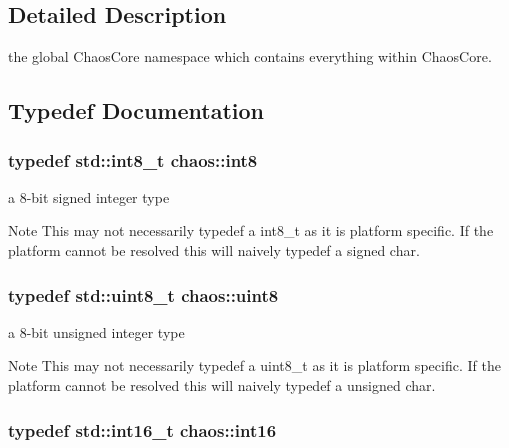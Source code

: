 \subsection{Detailed Description}
the global Chaos\-Core namespace which contains everything within Chaos\-Core. 

\subsection{Typedef Documentation}
\hypertarget{namespacechaos_a557c5c30e5a935845432e60c617bd688}{
\subsubsection[{int8}]{\setlength{\rightskip}{0pt plus 5cm}typedef std\-::int8\-\_\-t {\bf chaos\-::int8}}}\label{namespacechaos_a557c5c30e5a935845432e60c617bd688}


a 8-\/bit signed integer type 

\begin{DoxyNote}{Note}
This may not necessarily {\ttfamily typedef} a {\ttfamily int8\-\_\-t} as it is platform specific. If the platform cannot be resolved this will naively {\ttfamily typedef} a {\ttfamily signed char}. 
\end{DoxyNote}
\hypertarget{namespacechaos_acbc0796d6929e3182cfd4f5c0176ab51}{
\subsubsection[{uint8}]{\setlength{\rightskip}{0pt plus 5cm}typedef std\-::uint8\-\_\-t {\bf chaos\-::uint8}}}\label{namespacechaos_acbc0796d6929e3182cfd4f5c0176ab51}


a 8-\/bit unsigned integer type 

\begin{DoxyNote}{Note}
This may not necessarily {\ttfamily typedef} a {\ttfamily uint8\-\_\-t} as it is platform specific. If the platform cannot be resolved this will naively {\ttfamily typedef} a {\ttfamily unsigned char}. 
\end{DoxyNote}
\hypertarget{namespacechaos_a5dd2297d965311a05d313aaba7752f55}{
\subsubsection[{int16}]{\setlength{\rightskip}{0pt plus 5cm}typedef std\-::int16\-\_\-t {\bf chaos\-::int16}}}\label{namespacechaos_a5dd2297d965311a05d313aaba7752f55}


